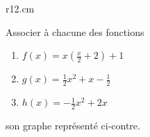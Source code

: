 
\begin{exercice}\label{exosmath-0271}

    \begin{wrapfigure}{r}{12.cm}
   \vspace{-2.5cm}        %
   \centering
   
\end{wrapfigure}

Associer à chacune des fonctions 
\begin{enumerate}
    \item
\( f(x)=x\left( \frac{ x }{2}+2 \right)+1\)
\item
\( g(x)=\frac{ 1 }{2}x^2+x-\frac{ 1 }{2}\)
\item
\( h(x)=-\frac{ 1 }{2}x^2+2x\)
\end{enumerate}
son graphe représenté ci-contre.

\end{exercice}

